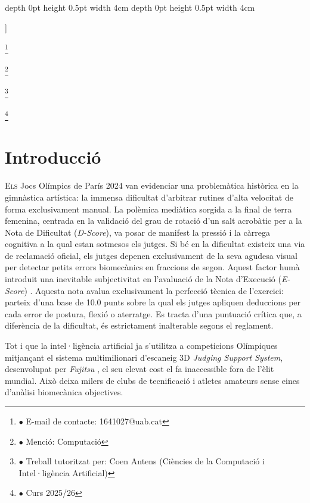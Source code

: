 \documentclass[10pt,a4paper,twocolumn,twoside]{article}
\newcommand\blfootnote[1]{%
  \begingroup
  \renewcommand\thefootnote{}\footnote{#1}%
  \addtocounter{footnote}{-1}%
  \endgroup
}
\begin{document}
\begin{@twocolumnfalse}
\begin{center}
\bigskip

{\vrule depth 0pt height 0.5pt width 4cm\hspace{7.5pt}%
%
\hspace{7.5pt}\vrule depth 0pt height 0.5pt width 4cm\relax}

\end{center}

\bigskip
\end{@twocolumnfalse}]

\blfootnote{$\bullet$ E-mail de contacte: 1641027@uab.cat}
\blfootnote{$\bullet$ Menció: Computació}
\blfootnote{$\bullet$ Treball tutoritzat per: Coen Antens (Ciències de la Computació i Intel·ligència Artificial)}
\blfootnote{$\bullet$ Curs 2025/26}

\section{Introducció}

\lettrine[lines=3]{E}{ls} Jocs Olímpics de París 2024 van evidenciar una problemàtica històrica en la gimnàstica artística: la immensa dificultat d'arbitrar rutines d'alta velocitat de forma exclusivament manual. La polèmica mediàtica sorgida a la final de terra femenina, centrada en la validació del grau de rotació d'un salt acrobàtic per a la Nota de Dificultat (\textit{D-Score})\cite{paris_2024}, va posar de manifest la pressió i la càrrega cognitiva a la qual estan sotmesos els jutges. Si bé en la dificultat existeix una via de reclamació oficial, els jutges depenen exclusivament de la seva agudesa visual per detectar petits errors biomecànics en fraccions de segon. Aquest factor humà introduit una inevitable subjectivitat en l'avaluació de la Nota d'Execució (\textit{E-Score}) \cite{olympics_scoring}. Aquesta nota avalua exclusivament la perfecció tècnica de l'exercici: parteix d'una base de 10.0 punts sobre la qual els jutges apliquen deduccions per cada error de postura, flexió o aterratge. Es tracta d'una puntuació crítica que, a diferència de la dificultat, és estrictament inalterable segons el reglament.

Tot i que la intel·ligència artificial ja s'utilitza a competicions Olímpiques mitjançant el sistema multimilionari d'escaneig 3D \textit{Judging Support System}, desenvolupat per \textit{Fujitsu} \cite{fujitsu_jss}, el seu elevat cost el fa inaccessible fora de l'èlit mundial. Això deixa milers de clubs de tecnificació i atletes amateurs sense eines d'anàlisi biomecànica objectives.
\end{document}
